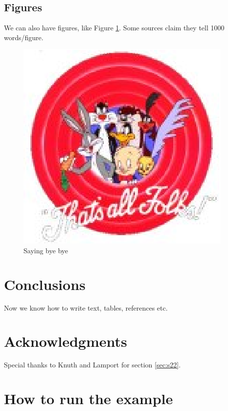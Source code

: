 \documentclass[11pt,a4paper,twoside,notitlepage]{article}
\begin{document}
\subsection{Figures}
We can also have figures, like Figure \ref{fig:bye}. Some sources claim they tell 1000 words/figure. 
 \begin{figure}
  \begin{center}
   \includegraphics{img/theend2.eps}
   \caption{Saying bye bye} %
   \label{fig:bye} %
  \end{center}
 \end{figure}
 


\section{Conclusions}

Now we know how to write text, tables, references etc.


\section*{Acknowledgments} %
Special thanks to Knuth and Lamport for section \ref{sec:s22}. %


\appendix

\section{How to run the example}
\end{document}
